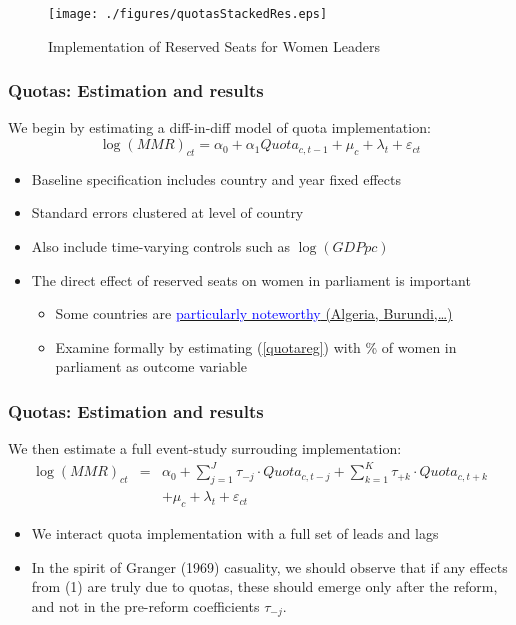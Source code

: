 \documentclass[9pt,letterpaper,subeqn]{beamer}
\begin{document}
\begin{frame}[label=quotaDesc]
  \begin{figure}
    \caption{Implementation of Reserved Seats for Women Leaders}
    \texttt{[image: ./figures/quotasStackedRes.eps]}
  \end{figure}
\end{frame}


\begin{frame}[label=Quotas]
\frametitle{Quotas: Estimation and results}
We begin by estimating a diff-in-diff model of quota implementation:
\begin{equation}
  \label{quotareg}
\log(MMR)_{ct} = \alpha_0 + \alpha_1 Quota_{c,t-1} + \mu_c + \lambda_t + \varepsilon_{ct}  
\end{equation}
\vspace{4mm}
\begin{itemize}
\item Baseline specification includes country and year fixed effects
\item Standard errors clustered at level of country
\item Also include time-varying controls such as $\log(GDP pc)$
\item The direct effect of reserved seats on women in parliament is important
  \begin{itemize}
    \item Some countries are \hyperlink{quotaCover}{{\textcolor{blue}{particularly noteworthy} (Algeria, Burundi,\ldots)}} 
  \item Examine formally by estimating (\ref{quotareg}) with \% of women in parliament as outcome variable
  \end{itemize}
  \end{itemize}
\end{frame}

\begin{frame}[label=Quotas2]
\frametitle{Quotas: Estimation and results}
We then estimate a full event-study surrouding implementation:
\begin{eqnarray}
  \log(MMR)_{ct} &=& \alpha_0 + \sum_{j=1}^J \tau_{-j}\cdot Quota_{c,t-j} + \sum_{k=1}^K \tau_{+k}\cdot Quota_{c,t+k} \nonumber \\
  && + \mu_c + \lambda_t + \varepsilon_{ct} \nonumber
\end{eqnarray}
\begin{itemize}
\item We interact quota implementation with a full set of leads and lags
\item In the spirit of Granger (1969) casuality, we should observe that if any effects from (1) are truly due to quotas, these should emerge only after the reform, and not in the pre-reform coefficients $\tau_{-j}.$
\end{itemize}
\end{frame}
\end{document}
